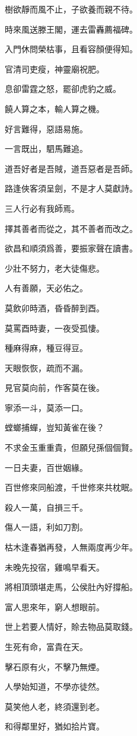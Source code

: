 \documentclass[12pt,a4paper]{ctexbook}
\begin{document}
樹欲靜而風不止，子欲養而親不待。\par
時來風送滕王閣，運去雷轟薦福碑。\par
入門休問榮枯事，且看容顏便得知。\par
官清司吏瘦，神靈廟祝肥。\par
息卻雷霆之怒，罷卻虎豹之威。\par
饒人算之本，輸人算之機。\par
好言難得，惡語易施。\par
一言既出，駟馬難追。\par
道吾好者是吾賊，道吾惡者是吾師。\par
路逢俠客須呈劍，不是才人莫獻詩。\par
三人行必有我師焉。\par
擇其善者而從之，其不善者而改之。\par
欲昌和順須爲善，要振家聲在讀書。\par
少壯不努力，老大徒傷悲。\par
人有善願，天必佑之。\par
莫飲卯時酒，昏昏醉到酉。\par
莫罵酉時妻，一夜受孤悽。\par
種麻得麻，種豆得豆。\par
天眼恢恢，疏而不漏。\par
見官莫向前，作客莫在後。\par
寧添一斗，莫添一口。\par
螳螂捕蟬，豈知黃雀在後？\par
不求金玉重重貴，但願兒孫個個賢。\par
一日夫妻，百世姻緣。\par
百世修來同船渡，千世修來共枕眠。\par
殺人一萬，自損三千。\par
傷人一語，利如刀割。\par
枯木逢春猶再發，人無兩度再少年。\par
未晚先投宿，雞鳴早看天。\par
將相頂頭堪走馬，公侯肚內好撐船。\par
富人思來年，窮人想眼前。\par
世上若要人情好，賒去物品莫取錢。\par
生死有命，富貴在天。\par
擊石原有火，不擊乃無煙。\par
人學始知道，不學亦徒然。\par
莫笑他人老，終須還到老。\par
和得鄰里好，猶如拾片寶。\par
\end{document}

